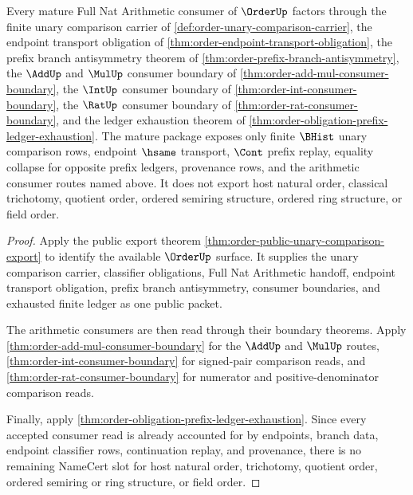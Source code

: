 \begin{theorem}
\label{thm:order-finite-arithmetic-mature-consumer-package}
Every mature Full Nat Arithmetic consumer of $\OrderUp$ factors through the finite unary comparison carrier of \autoref{def:order-unary-comparison-carrier}, the endpoint transport obligation of \autoref{thm:order-endpoint-transport-obligation}, the prefix branch antisymmetry theorem of \autoref{thm:order-prefix-branch-antisymmetry}, the $\AddUp$ and $\MulUp$ consumer boundary of \autoref{thm:order-add-mul-consumer-boundary}, the $\IntUp$ consumer boundary of \autoref{thm:order-int-consumer-boundary}, the $\RatUp$ consumer boundary of \autoref{thm:order-rat-consumer-boundary}, and the ledger exhaustion theorem of \autoref{thm:order-obligation-prefix-ledger-exhaustion}. The mature package exposes only finite $\BHist$ unary comparison rows, endpoint $\hsame$ transport, $\Cont$ prefix replay, equality collapse for opposite prefix ledgers, provenance rows, and the arithmetic consumer routes named above. It does not export host natural order, classical trichotomy, quotient order, ordered semiring structure, ordered ring structure, or field order.
\end{theorem}
\begin{proof}
Apply the public export theorem \autoref{thm:order-public-unary-comparison-export} to identify the available $\OrderUp$ surface. It supplies the unary comparison carrier, classifier obligations, Full Nat Arithmetic handoff, endpoint transport obligation, prefix branch antisymmetry, consumer boundaries, and exhausted finite ledger as one public packet.

The arithmetic consumers are then read through their boundary theorems. Apply \autoref{thm:order-add-mul-consumer-boundary} for the $\AddUp$ and $\MulUp$ routes, \autoref{thm:order-int-consumer-boundary} for signed-pair comparison reads, and \autoref{thm:order-rat-consumer-boundary} for numerator and positive-denominator comparison reads.

Finally, apply \autoref{thm:order-obligation-prefix-ledger-exhaustion}. Since every accepted consumer read is already accounted for by endpoints, branch data, endpoint classifier rows, continuation replay, and provenance, there is no remaining NameCert slot for host natural order, trichotomy, quotient order, ordered semiring or ring structure, or field order.
\end{proof}

